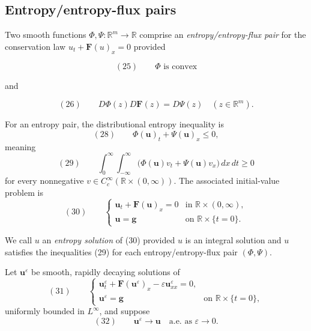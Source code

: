 \subsection{Entropy/entropy-flux pairs}\label{sec:entropy-entropy-flux-pairs}

\begin{definition}
\label{def:entropy-entropy-flux-pair-system}
Two smooth functions $\Phi, \Psi:\mathbb{R}^m\to\mathbb{R}$ comprise an \textit{entropy/entropy-flux pair} for the conservation law $u_t + \mathbf{F}(u)_x = 0$ provided

$$(25) \qquad \Phi \text{ is convex}$$

and

$$(26) \qquad D\Phi(z)D\mathbf{F}(z) = D\Psi(z) \quad (z\in\mathbb{R}^m).$$
\end{definition}

For an entropy pair, the distributional entropy inequality is
\[
(28)\qquad \Phi(\mathbf u)_t+\Psi(\mathbf u)_x\leq0,
\]
meaning
\[
(29)\qquad
\int_0^\infty\!\int_{-\infty}^{\infty}
\bigl(\Phi(\mathbf u)v_t+\Psi(\mathbf u)v_x\bigr)\,dx\,dt\geq0
\]
for every nonnegative $v\in C_c^\infty(\mathbb R\times(0,\infty))$. The associated initial-value problem is
\[
(30)\qquad
\begin{cases}
\mathbf u_t+\mathbf F(\mathbf u)_x=0 & \text{in }\mathbb R\times(0,\infty),\\
\mathbf u=\mathbf g & \text{on }\mathbb R\times\{t=0\}.
\end{cases}
\]

\begin{definition}
\label{def:entropy-solution-system}

We call $u$ an \textit{entropy solution} of (30) provided $u$ is an integral solution and $u$ satisfies the inequalities (29) for each entropy/entropy-flux pair $(\Phi,\Psi)$.
\end{definition}

Let $\mathbf u^\varepsilon$ be smooth, rapidly decaying solutions of
\[
(31)\qquad
\begin{cases}
\mathbf u_t^\varepsilon+\mathbf F(\mathbf u^\varepsilon)_x
-\varepsilon\mathbf u_{xx}^\varepsilon=0,\\
\mathbf u^\varepsilon=\mathbf g & \text{on }\mathbb R\times\{t=0\},
\end{cases}
\]
uniformly bounded in $L^\infty$, and suppose
\[
(32)\qquad \mathbf u^\varepsilon\to\mathbf u\quad\text{a.e. as }\varepsilon\to0.
\]

